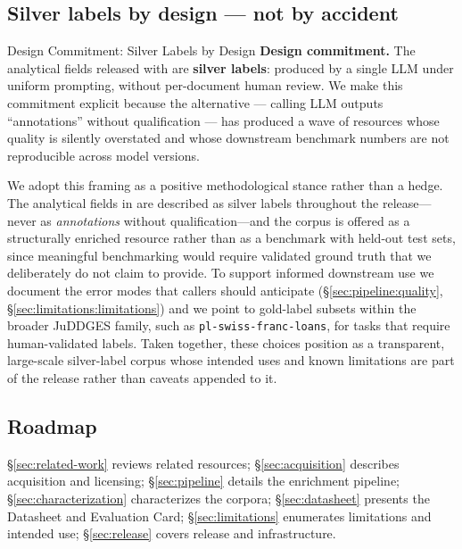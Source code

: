\subsection{Silver labels by design --- not by accident}
\label{sec:intro:silver}

\begin{silverbox}{Design Commitment: Silver Labels by Design}
\textbf{Design commitment.} The analytical fields released with \juddgespl{} are \textbf{silver labels}: produced by a single LLM under uniform prompting, without per-document human review. We make this commitment explicit because the alternative --- calling LLM outputs ``annotations'' without qualification --- has produced a wave of resources whose quality is silently overstated and whose downstream benchmark numbers are not reproducible across model versions.
\end{silverbox}

We adopt this framing as a positive methodological stance rather than a hedge. The analytical fields in \juddgespl{} are described as silver labels throughout the release---never as \emph{annotations} without qualification---and the corpus is offered as a structurally enriched resource rather than as a benchmark with held-out test sets, since meaningful benchmarking would require validated ground truth that we deliberately do not claim to provide. To support informed downstream use we document the error modes that callers should anticipate (\S\ref{sec:pipeline:quality}, \S\ref{sec:limitations:limitations}) and we point to gold-label subsets within the broader JuDDGES family, such as \texttt{pl-swiss-franc-loans}, for tasks that require human-validated labels. Taken together, these choices position \juddgespl{} as a transparent, large-scale silver-label corpus whose intended uses and known limitations are part of the release rather than caveats appended to it.

\subsection{Roadmap}
\label{sec:intro:roadmap}

\S\ref{sec:related-work} reviews related resources; \S\ref{sec:acquisition} describes acquisition and licensing; \S\ref{sec:pipeline} details the enrichment pipeline; \S\ref{sec:characterization} characterizes the corpora; \S\ref{sec:datasheet} presents the Datasheet and Evaluation Card; \S\ref{sec:limitations} enumerates limitations and intended use; \S\ref{sec:release} covers release and infrastructure.
